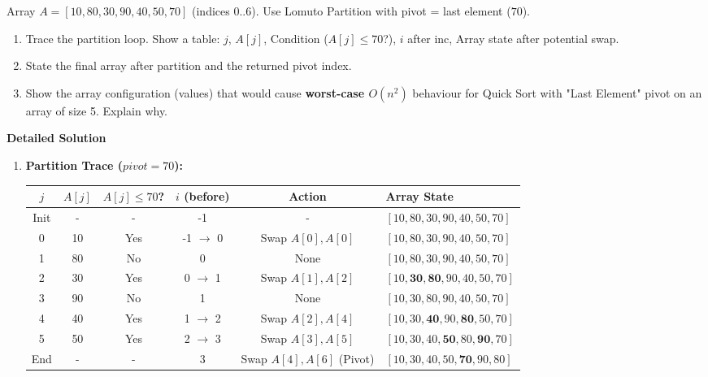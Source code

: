 \documentclass[11pt]{article}
\begin{document}
\begin{exoresolu}
    Array $A = [10, 80, 30, 90, 40, 50, 70]$ (indices 0..6). Use Lomuto Partition with pivot = last element ($70$).
    \begin{enumerate}
        \item Trace the partition loop. Show a table: $j$, $A[j]$, Condition ($A[j] \le 70$?), $i$ after inc, Array state after potential swap.
        \item State the final array after partition and the returned pivot index.
        \item Show the array configuration (values) that would cause \textbf{worst-case $O(n^2)$} behaviour for Quick Sort with "Last Element" pivot on an array of size 5. Explain why.
    \end{enumerate}
    \tcblower
    \textbf{Detailed Solution}
    \begin{enumerate}
        \item \textbf{Partition Trace ($pivot=70$):}
            \begin{center}
            \begin{tabularx}{\linewidth}{|c|c|c|c|c|X|}\hline
            \rowcolor{popblueL}
            $j$ & $A[j]$ & $A[j] \le 70$? & $i$ (before) & Action & Array State \\ \hline
            Init & - & - & -1 & - & $[10, 80, 30, 90, 40, 50, 70]$ \\ \hline
            0 & 10 & Yes & -1 $\rightarrow$ 0 & Swap $A[0],A[0]$ & $[10, 80, 30, 90, 40, 50, 70]$ \\ \hline
            1 & 80 & No & 0 & None & $[10, 80, 30, 90, 40, 50, 70]$ \\ \hline
            2 & 30 & Yes & 0 $\rightarrow$ 1 & Swap $A[1],A[2]$ & $[10, \mathbf{30}, \mathbf{80}, 90, 40, 50, 70]$ \\ \hline
            3 & 90 & No & 1 & None & $[10, 30, 80, 90, 40, 50, 70]$ \\ \hline
            4 & 40 & Yes & 1 $\rightarrow$ 2 & Swap $A[2],A[4]$ & $[10, 30, \mathbf{40}, 90, \mathbf{80}, 50, 70]$ \\ \hline
            5 & 50 & Yes & 2 $\rightarrow$ 3 & Swap $A[3],A[5]$ & $[10, 30, 40, \mathbf{50}, 80, \mathbf{90}, 70]$ \\ \hline
            End & - & - & 3 & Swap $A[4], A[6]$ (Pivot) & $[10, 30, 40, 50, \mathbf{70}, 90, 80]$ \\ \hline
            \end{tabularx}

\end{center}
\end{enumerate}
\end{exoresolu}
\end{document}
